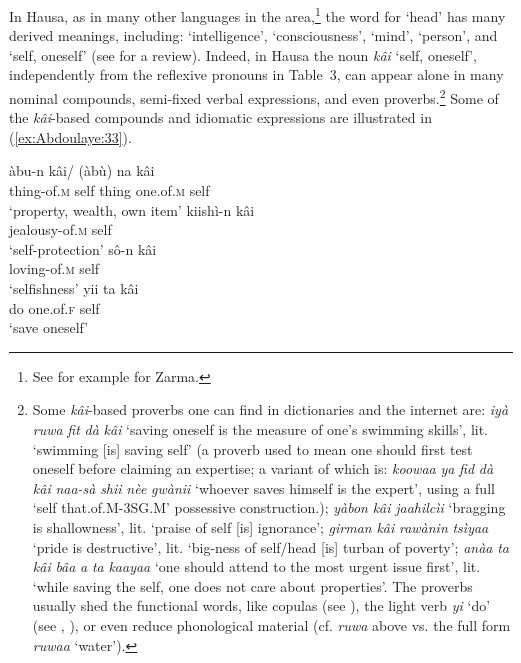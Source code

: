 \documentclass[output=paper]{langscibook}
\begin{document}
In Hausa, as in many other languages in the area,\footnote{See for example \citet[39]{BernardWhite-Kaba1994} for Zarma.} the word for `head’ has many derived meanings, including: `intelligence’, `consciousness’, `mind’, `person’, and `self, oneself’ (see \citealt{Will2019} for a review). Indeed, in Hausa the noun \textit{kâi} ‘self, oneself’, independently from the reflexive pronouns in Table~3, can appear alone in many nominal compounds, semi-fixed verbal expressions, and even proverbs.\footnote{Some \textit{kâi}{}-based proverbs one can find in dictionaries and the internet are: \textit{iyà} \textit{ruwa} \textit{fit} \textit{dà} \textit{kâi} ‘saving oneself is the measure of one’s swimming skills’, lit. ‘swimming [is] saving self’ (a proverb used to mean one should first test oneself before claiming an expertise; a variant of which is: \textit{koowaa} \textit{ya} \textit{fid} \textit{dà} \textit{kâi} \textit{naa\nobreakdash-sà} \textit{shii} \textit{nèe} \textit{gwànii} ‘whoever saves himself is the expert’, using a full ‘self that.of.M\nobreakdash-3SG.M’ possessive construction.); \textit{yàbon} \textit{kâi} \textit{jaahilcìi} ‘bragging is shallowness’, lit. ‘praise of self [is] ignorance’; \textit{girman} \textit{kâi} \textit{rawànin} \textit{tsìyaa} ‘pride is destructive’, lit. ‘big-ness of self/head [is] turban of poverty’; \textit{anàa} \textit{ta} \textit{kâi} \textit{bâa} \textit{a} \textit{ta} \textit{kaayaa} ‘one should attend to the most urgent issue first’, lit. ‘while saving the self, one does not care about properties’. The proverbs usually shed the functional words, like copulas (see \citealt[164f]{Newman2000}), the light verb \textit{yi} ‘do’ (see \citealt[171]{Jaggar2001}, \citealt[281]{Newman2000}), or even reduce phonological material (cf. \textit{ruwa} above vs. the full form \textit{ruwaa} ‘water’).} Some of the \textit{kâi}{}-based compounds and idiomatic expressions are illustrated in (\ref{ex:Abdoulaye:33}).


\ea%
    \label{ex:Abdoulaye:33}
    \ea \label{ex:Abdoulaye:33a}
    \gll àbu-n  kâi/  (àbù)  na  kâi\\
    thing-of.\textsc{m}  self  thing  one.of.\textsc{m}  self\\
    \glt `property, wealth, own item’
    \ex \label{ex:Abdoulaye:33b}
    \gll  kiishì-n  kâi\\
    jealousy-of.\textsc{m}  self\\
    \glt `self-protection’
    \ex \label{ex:Abdoulaye:33c}
    \gll sô-n  kâi\\
    loving-of.\textsc{m}  self\\
    \glt `selfishness’
    \ex \label{ex:Abdoulaye:33d}
    \gll yii  ta  kâi\\
    do  one.of.\textsc{f}  self\\
    \glt `save oneself’
    \z
\z
 
\end{document}

